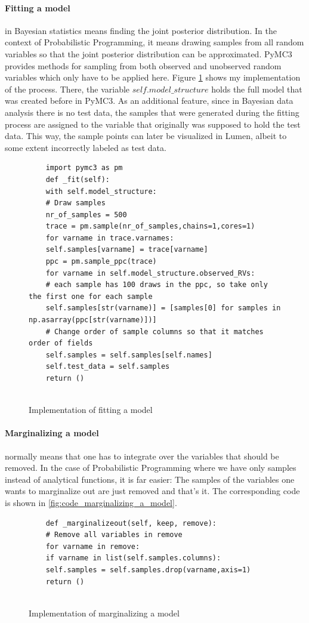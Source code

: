 \documentclass{article}
\begin{document}
\paragraph{Fitting a model} in Bayesian statistics means finding the joint posterior distribution. In the context of Probabilistic Programming, it means drawing samples from all random variables so that the joint posterior distribution can be approximated. PyMC3 provides methods for sampling from both observed and unobserved random variables which only have to be applied here. Figure \ref{fig:code_fitting_a_model} shows my implementation of the process. There, the variable $self.model\_structure$ holds the full model that was created before in PyMC3. As an additional feature, since in Bayesian data analysis there is no test data, the samples that were generated during the fitting process are assigned to the variable that originally was supposed to hold the test data. This way, the sample points can later be visualized in Lumen, albeit to some extent incorrectly labeled as test data.
\begin{figure}[h]
	\begin{lstlisting}
	import pymc3 as pm
	def _fit(self):
	with self.model_structure:
	# Draw samples
	nr_of_samples = 500
	trace = pm.sample(nr_of_samples,chains=1,cores=1)
	for varname in trace.varnames:
	self.samples[varname] = trace[varname]
	ppc = pm.sample_ppc(trace)
	for varname in self.model_structure.observed_RVs:
	# each sample has 100 draws in the ppc, so take only the first one for each sample
	self.samples[str(varname)] = [samples[0] for samples in np.asarray(ppc[str(varname)])]			
	# Change order of sample columns so that it matches order of fields
	self.samples = self.samples[self.names]
	self.test_data = self.samples
	return ()
	
	\end{lstlisting}
	\caption[Implementation of fitting a model]{Implementation of fitting a model}
	\label{fig:code_fitting_a_model}
\end{figure}

\paragraph{Marginalizing a model} normally means that one has to integrate over the variables that should be removed. In the case of Probabilistic Programming where we have only samples instead of analytical functions, it is far easier: The samples of the variables one wants to marginalize out are just removed and that's it. The corresponding code is shown in \autoref{fig:code_marginalizing_a_model}.
\begin{figure}[h]
	\begin{lstlisting}
	def _marginalizeout(self, keep, remove):
	# Remove all variables in remove
	for varname in remove:
	if varname in list(self.samples.columns):
	self.samples = self.samples.drop(varname,axis=1)
	return ()
	
	\end{lstlisting}
	\caption[Implementation of marginalizing a model]{Implementation of marginalizing a model}
	\label{fig:code_marginalizing_a_model}
\end{figure}
\end{document}
